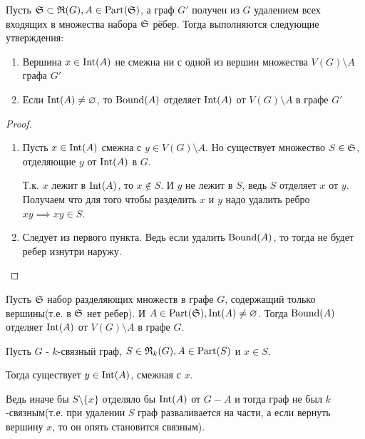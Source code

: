 \begin{customthm}{1} \label{theorem:0_1}
	Пусть $\S \subset \R(G), A \in \Part(\S)$, а граф  $G'$ получен из  $G$ удалением всех входящих в множества набора  $\S$ рёбер.
	Тогда выполняются следующие утверждения:
	 \begin{enumerate}
		 \item Вершина $x \in \Int(A)$ не смежна ни с одной из вершин множества  $V(G) \setminus A$ графа  $G'$
		\item Если  $\Int(A) \neq \varnothing$, то  $\Bound(A)$ отделяет  $\Int(A)$ от $V(G) \setminus A$ в графе  $G'$
	\end{enumerate}
\end{customthm}
\begin{proof}
	\begin{enumerate}
		\item Пусть $x \in \Int(A)$ смежна с  $y \in V(G) \setminus A$.
			Но существует множество  $S \in \S$, отделяющие  $y$ от  $\Int(A)$ в  $G$.

			Т.к. $x$ лежит в $\Int(A)$, то  $x \not \in S$.
			И $y$ не лежит в  $S$, ведь  $S$ отделяет  $x$ от  $y$.
			Получаем что для того чтобы разделить $x$ и  $y$ надо удалить ребро  $xy \implies xy \in S$.

		\item Следует из первого пункта. Ведь если удалить $\Bound(A)$, то тогда не будет ребер изнутри наружу.
	\end{enumerate}
\end{proof}

\begin{customcrly}{1}\label{corollary:0_1}
	Пусть $\S$ набор разделяющих множеств в графе  $G$, содержащий только вершины(т.е. в $\S$ нет ребер).
	И $A \in \Part(\S), \Int(A) \neq \varnothing$.
	Тогда  $\Bound(A)$ отделяет $\Int(A)$ от $V(G) \setminus A$ в графе  $G$.
\end{customcrly}

\begin{remrk} \label{remark:0_inside_connected_with_bound}
	Пусть $G$ - $k$-связный граф, $S \in \R_k(G), A \in \Part(S)$ и $x \in S$.

	Тогда существует $y \in \Int(A)$, смежная с $x$.

	Ведь иначе бы $S \setminus \{x\}$ отделяло бы  $\Int(A)$ от $G - A$ и тогда граф не был $k$-связным(т.е. при удалении $S$ граф разваливается на части, а если вернуть вершину $x$, то он опять становится связным).
\end{remrk}

